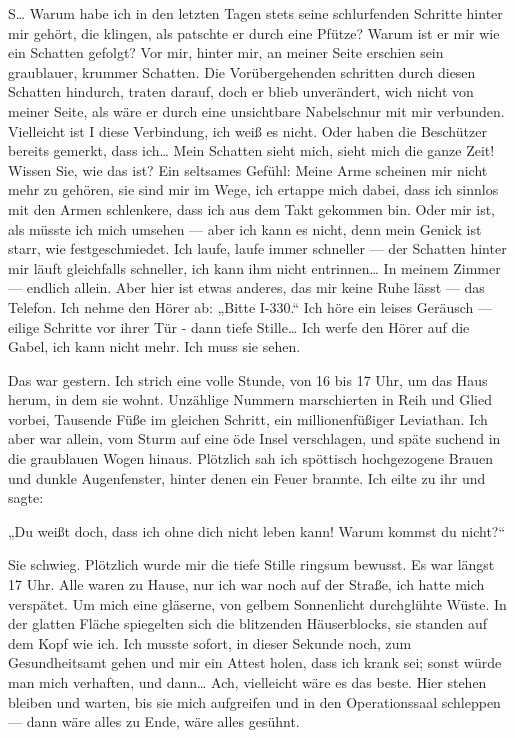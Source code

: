 S\ldots{} Warum habe ich in den letzten Tagen stets seine schlurfenden
Schritte hinter mir gehört, die klingen, als patschte er durch eine
Pfütze? Warum ist er mir wie ein Schatten gefolgt? Vor mir, hinter
mir, an meiner Seite erschien sein graublauer, krummer Schatten.
Die Vorübergehenden schritten durch diesen Schatten hindurch,
traten darauf, doch er blieb unverändert, wich nicht von meiner
Seite, als wäre er durch eine unsichtbare Nabelschnur mit mir
verbunden. Vielleicht ist I diese Verbindung, ich weiß es nicht.
Oder haben die Beschützer bereits gemerkt, dass ich\ldots{} Mein
Schatten sieht mich, sieht mich die ganze Zeit! Wissen Sie, wie das
ist? Ein seltsames Gefühl: Meine Arme scheinen mir nicht mehr zu
gehören, sie sind mir im Wege, ich ertappe mich dabei, dass ich
sinnlos mit den Armen schlenkere, dass ich aus dem Takt gekommen
bin. Oder mir ist, als müsste ich mich umsehen — aber ich kann es
nicht, denn mein Genick ist starr, wie festgeschmiedet. Ich laufe,
laufe immer schneller — der Schatten hinter mir läuft gleichfalls
schneller, ich kann ihm nicht entrinnen\ldots{} In meinem Zimmer —
endlich allein. Aber hier ist etwas anderes, das mir keine Ruhe
lässt — das Telefon. Ich nehme den Hörer ab: „Bitte I-330.“ Ich
höre ein leises Geräusch — eilige Schritte vor ihrer Tür - dann
tiefe Stille\ldots{} Ich werfe den Hörer auf
die Gabel, ich kann nicht mehr. Ich muss sie sehen.

Das war
gestern. Ich strich eine volle Stunde, von 16 bis 17 Uhr, um das
Haus herum, in dem sie wohnt. Unzählige Nummern marschierten in
Reih und Glied vorbei, Tausende Füße im gleichen Schritt, ein
millionenfüßiger Leviathan. Ich aber war allein, vom Sturm auf eine
öde Insel verschlagen, und späte suchend in die graublauen Wogen
hinaus. Plötzlich sah ich spöttisch hochgezogene Brauen und dunkle
Augenfenster, hinter denen ein Feuer brannte. Ich eilte zu ihr und
sagte:

„Du weißt doch, dass ich ohne dich nicht leben kann! Warum kommst
du nicht?“

Sie schwieg. Plötzlich wurde mir die tiefe Stille ringsum bewusst.
Es war längst 17 Uhr. Alle waren zu Hause, nur ich war noch auf der
Straße, ich hatte mich verspätet. Um mich eine gläserne, von gelbem
Sonnenlicht durchglühte Wüste. In der glatten Fläche spiegelten
sich die blitzenden Häuserblocks, sie standen auf dem Kopf wie ich.
Ich musste sofort, in dieser Sekunde noch, zum Gesundheitsamt gehen
und mir ein Attest holen, dass ich krank sei; sonst würde man mich
verhaften, und dann\ldots{} Ach, vielleicht wäre es das beste. Hier
stehen bleiben und warten, bis sie mich aufgreifen und in den
Operationssaal schleppen — dann wäre alles zu Ende, wäre alles
gesühnt.

